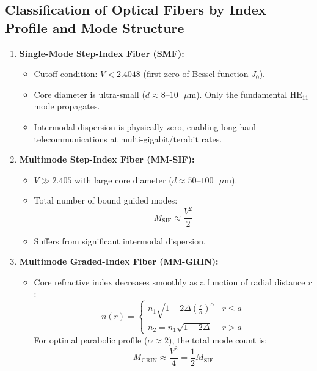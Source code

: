 \subsection{Classification of Optical Fibers by Index Profile and Mode Structure}
\begin{enumerate}[leftmargin=*,itemsep=3pt]
    \item \textbf{Single-Mode Step-Index Fiber (SMF):}
    \begin{itemize}
        \item Cutoff condition: $V < 2.4048$ (first zero of Bessel function $J_0$).
        \item Core diameter is ultra-small ($d \approx 8\text{--}10\text{ }\mu\text{m}$). Only the fundamental $\text{HE}_{11}$ mode propagates.
        \item Intermodal dispersion is physically zero, enabling long-haul telecommunications at multi-gigabit/terabit rates.
    \end{itemize}
    \item \textbf{Multimode Step-Index Fiber (MM-SIF):}
    \begin{itemize}
        \item $V \gg 2.405$ with large core diameter ($d \approx 50\text{--}100\text{ }\mu\text{m}$).
        \item Total number of bound guided modes:
        \begin{equation}
        M_{\text{SIF}} \approx \frac{V^2}{2}
        \end{equation}
        \item Suffers from significant intermodal dispersion.
    \end{itemize}
    \item \textbf{Multimode Graded-Index Fiber (MM-GRIN):}
    \begin{itemize}
        \item Core refractive index decreases smoothly as a function of radial distance $r$:
        \begin{equation}
        n(r) = \begin{cases} n_1 \sqrt{1 - 2\Delta\left(\frac{r}{a}\right)^\alpha} & r \le a \\ n_2 = n_1\sqrt{1 - 2\Delta} & r > a \end{cases}
        \end{equation}
        For optimal parabolic profile ($\alpha \approx 2$), the total mode count is:
        \begin{equation}
        M_{\text{GRIN}} \approx \frac{V^2}{4} = \frac{1}{2} M_{\text{SIF}}
        \end{equation}
    \end{itemize}
\end{enumerate}

